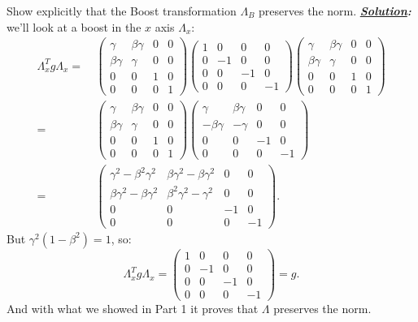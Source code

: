 \documentclass[notitlepage]{report}
\begin{document}
\begin{question}[title = Question 1.2]{}{}
Show explicitly that the Boost transformation $\Lambda_B$ preserves the norm.
\tcblower
\textbf{\emph{\underline{Solution}:}}\\
we'll look at a boost in the $x$ axis $\Lambda_x$:\\
 \begin{align*}
	\Lambda_x^Tg\Lambda_x =&\ 
	\begin{pmatrix}
		\gamma & \beta\gamma & 0 & 0\\
		\beta\gamma & \gamma & 0 & 0\\
		0 & 0 & 1 & 0\\
		0 & 0 & 0 & 1
	\end{pmatrix}
	\begin{pmatrix}
		1 & 0 & 0 & 0\\
		0 & -1& 0 & 0\\
		0 & 0 & -1 & 0\\
		0 & 0 & 0 & -1
	\end{pmatrix}
	\begin{pmatrix}
		\gamma & \beta\gamma & 0 & 0\\
		\beta\gamma & \gamma & 0 & 0\\
		0 & 0 & 1 & 0\\
		0 & 0 & 0 & 1
	\end{pmatrix}\\
	 =&\ 
	\begin{pmatrix}
		\gamma & \beta\gamma & 0 & 0\\
		\beta\gamma & \gamma & 0 & 0\\
		0 & 0 & 1 & 0\\
		0 & 0 & 0 & 1
	\end{pmatrix}
	\begin{pmatrix}
		\gamma & \beta\gamma & 0 & 0\\
		-\beta\gamma & -\gamma & 0 & 0\\
		0 & 0 & -1 & 0\\
		0 & 0 & 0 & -1
	\end{pmatrix}\\
	 =&\ 
	\begin{pmatrix}
		\gamma^2-\beta^2\gamma^2 & \beta\gamma^2-\beta\gamma^2 & 0 & 0\\
		\beta\gamma^2-\beta\gamma^2 & \beta^2\gamma^2-\gamma^2 & 0 & 0\\
		0 & 0 & -1 & 0\\
		0 & 0 & 0 & -1
	\end{pmatrix}
.\end{align*}
\tcbbreak
But $\gamma^2\left(1-\beta^2\right)=1$, so:\\
\[
	\Lambda_x^Tg\Lambda_x = 
	\begin{pmatrix}
		1 & 0 & 0 & 0\\
		0 & -1& 0 & 0\\
		0 & 0 & -1 & 0\\
		0 & 0 & 0 & -1
	\end{pmatrix}
	=g
.\] 
And with what we showed in Part 1 it proves that $\Lambda$ preserves the norm.
\end{question}
\end{document}
